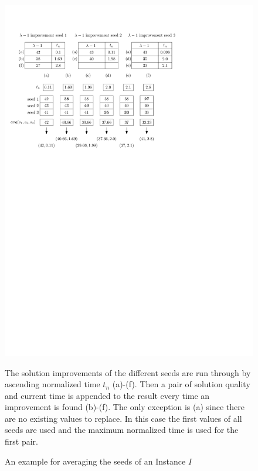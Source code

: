 \documentclass[a4paper,12pt,bibtotoc,titlepage, liststotoc,BCOR7mm,headsepline,pointlessnumbers]{scrbook}
\numberwithin{equation}{section}
\begin{document}
\begin{figure}[H] 
    
  \begin{center}
   \includegraphics[width=.9\textwidth]{Ipe/seed_averaging_example.pdf}
  \caption{An example for averaging the seeds of an Instance $I$}\label{fig:img.png} %
  \end{center}
    The solution improvements of the different seeds are run through by ascending normalized time $t_n$ (a)-(f). Then a pair of solution quality and current time is appended to the result every time an improvement is found (b)-(f). The only exception is (a) since there are no existing values to replace. In this case the first values of all seeds are used and the maximum normalized time is used for the first pair.
\end{figure}
\end{document}
